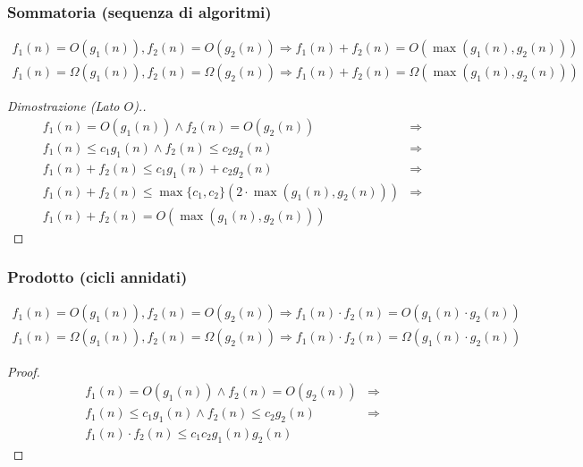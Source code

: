         \subsubsection{Sommatoria (sequenza di algoritmi)}
            $$
                \begin{aligned}
                    f_1(n) = O(g_1(n)), f_2(n) = O(g_2(n)) \Rightarrow f_1(n) + f_2(n) = O(\max(g_1(n),g_2(n)))\\
                    f_1(n) = \Omega(g_1(n)), f_2(n) = \Omega(g_2(n)) \Rightarrow f_1(n) + f_2(n) = \Omega(\max(g_1(n),g_2(n)))
                \end{aligned}
            $$
            \begin{proof}[Dimostrazione (Lato $ O $).]
                $$
                    \begin{aligned}
                        f_1(n) = O(g_1(n)) \land f_2(n) = O(g_2(n)) & \Rightarrow \\
                        f_1(n) \leq c_1g_1(n) \land f_2(n) \leq c_2g_2(n) & \Rightarrow \\
                        f_1(n) + f_2(n) \leq c_1g_1(n) + c_2g_2(n) & \Rightarrow \\
                        f_1(n) + f_2(n) \leq \max\{c_1,c_2\}(2\cdot \max(g_1(n),g_2(n))) & \Rightarrow \\
                        f_1(n) + f_2(n) = O(\max(g_1(n),g_2(n))) &
                    \end{aligned}
                $$
            \end{proof}
        \subsubsection{Prodotto (cicli annidati)}
            $$
                \begin{aligned}
                    f_1(n) = O(g_1(n)), f_2(n) = O(g_2(n)) \Rightarrow f_1(n) \cdot f_2(n) = O(g_1(n) \cdot g_2(n))\\
                    f_1(n) = \Omega(g_1(n)), f_2(n) = \Omega(g_2(n)) \Rightarrow f_1(n) \cdot f_2(n) = \Omega(g_1(n) \cdot g_2(n))
                \end{aligned}
            $$
            \begin{proof}
                $$
                    \begin{aligned}
                        f_1(n) = O(g_1(n)) \land f_2(n) = O(g_2(n)) & \Rightarrow \\
                        f_1(n) \leq c_1g_1(n) \land f_2(n) \leq c_2g_2(n) & \Rightarrow \\
                        f_1(n)\cdot f_2(n) \leq c_1c_2g_1(n)g_2(n) &
                    \end{aligned}
                $$
        \end{proof}
